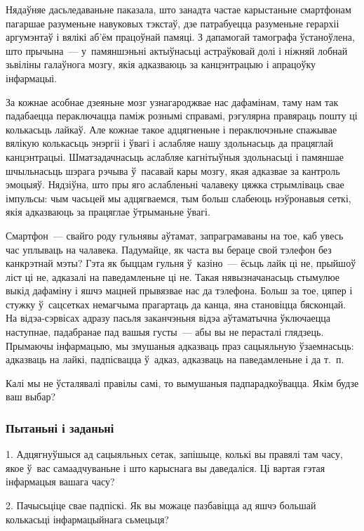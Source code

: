 Нядаўняе дасьледаваньне паказала, што занадта частае карыстаньне смартфонам пагаршае разуменьне навуковых тэкстаў, дзе патрабуецца разуменьне герархіі аргумэнтаў і вялікі аб'ём працоўнай памяці. З дапамогай тамографа ўстаноўлена, што прычына~--- у~памяншэньні актыўнасьці астраўковай долі і ніжняй лобнай зьвіліны галаўнога мозгу, якія адказваюць за канцэнтрацыю і апрацоўку інфармацыі.

За кожнае асобнае дзеяньне мозг узнагароджвае нас дафамінам, таму нам так падабаецца пераключацца паміж рознымі справамі, рэгулярна правяраць пошту ці колькасьць лайкаў. Але кожнае такое адцягненьне і пераключэньне спажывае вялікую колькасьць энэргіі і ўвагі і аслабляе нашу здольнасьць да працяглай канцэнтрацыі. Шматзадачнасьць аслабляе кагнітыўныя здольнасьці і памяншае шчыльнасьць шэрага рэчыва ў~пасавай кары мозгу, якая адказвае за кантроль эмоцыяў. Нядзіўна, што пры яго аслабленьні чалавеку цяжка стрымліваць свае імпульсы: чым часьцей мы адцягваемся, тым больш слабеюць нэўронавыя сеткі, якія адказваюць за працяглае ўтрыманьне ўвагі.

Смартфон~--- свайго роду гульнявы аўтамат, запраграмаваны на тое, каб увесь час уплываць на чалавека. Падумайце, як часта вы бераце свой тэлефон без канкрэтнай мэты? Гэта як быццам гульня ў~казіно~--- ёсьць лайк ці не, прыйшоў ліст ці не, адказалі на паведамленьне ці не. Такая нявызначанасьць стымулюе выкід дафаміну і яшчэ мацней прывязвае нас да тэлефона. Больш за тое, цяпер і стужку ў~сацсетках немагчыма прагартаць да канца, яна становіцца бясконцай. На відэа-сэрвісах адразу пасьля заканчэньня відэа аўтаматычна ўключаецца наступнае, падабранае пад вашыя густы~--- абы вы не перасталі глядзець. Прымаючы інфармацыю, мы змушаныя адказваць праз сацыяльную ўзаемнасьць: адказваць на лайкі, падпісвацца ў~адказ, адказваць на паведамленьне і да т.~п.

Калі мы не ўсталявалі правілы самі, то вымушаныя падпарадкоўвацца. Якім будзе ваш выбар?

\subsubsection{Пытаньні і заданьні}

1. Адцягнуўшыся ад сацыяльных сетак, запішыце, колькі вы правялі там часу, якое ў~вас самаадчуваньне і што карыснага вы даведаліся. Ці вартая гэтая інфармацыя вашага часу?

2. Пачысьціце свае падпіскі. Як вы можаце пазбавіцца ад яшчэ большай колькасьці інфармацыйнага сьмецьця?

